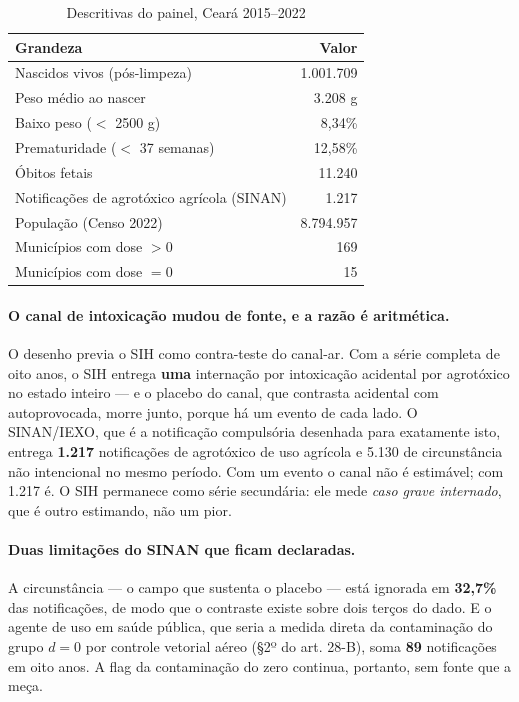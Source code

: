 \begin{table}[htbp]
\centering
\caption{Descritivas do painel, Ceará 2015--2022}
\label{tab:descritivas}
\small
\begin{tabular}{lr}
\toprule
\textbf{Grandeza} & \textbf{Valor} \\
\midrule
Nascidos vivos (pós-limpeza)            & 1.001.709 \\
Peso médio ao nascer                    & 3.208 g \\
Baixo peso (\(<\) 2500 g)               & 8,34\% \\
Prematuridade (\(<\) 37 semanas)        & 12,58\% \\
Óbitos fetais                           & 11.240 \\
Notificações de agrotóxico agrícola (SINAN) & 1.217 \\
População (Censo 2022)                  & 8.794.957 \\
\midrule
Municípios com dose \(> 0\)             & 169 \\
Municípios com dose \(= 0\)             & 15 \\
\bottomrule
\end{tabular}
\end{table}

\paragraph{O canal de intoxicação mudou de fonte, e a razão é aritmética.}
O desenho previa o SIH como contra-teste do canal-ar. Com a série completa de
oito anos, o SIH entrega \textbf{uma} internação por intoxicação acidental por
agrotóxico no estado inteiro --- e o placebo do canal, que contrasta acidental
com autoprovocada, morre junto, porque há um evento de cada lado. O SINAN/IEXO,
que é a notificação compulsória desenhada para exatamente isto, entrega
\textbf{1.217} notificações de agrotóxico de uso agrícola e 5.130 de
circunstância não intencional no mesmo período. Com um evento o canal não é
estimável; com 1.217 é. O SIH permanece como série secundária: ele mede
\emph{caso grave internado}, que é outro estimando, não um pior.

\paragraph{Duas limitações do SINAN que ficam declaradas.}
A circunstância --- o campo que sustenta o placebo --- está ignorada em
\textbf{32,7\%} das notificações, de modo que o contraste existe sobre dois
terços do dado. E o agente de uso em saúde pública, que seria a medida direta da
contaminação do grupo \(d = 0\) por controle vetorial aéreo (§2º do art. 28-B),
soma \textbf{89} notificações em oito anos. A flag da contaminação do zero
continua, portanto, sem fonte que a meça.

